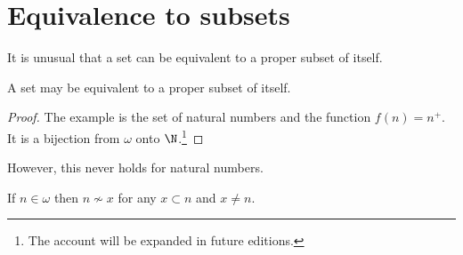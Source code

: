 \section*{Equivalence to subsets}

It is unusual that a set can be equivalent to a proper subset of itself.

\begin{proposition}
A set may be equivalent to a proper subset of itself.
\begin{proof}The example is the set of natural numbers and the function $f(n) = n^+$.
It is a bijection from $\omega $ onto $\N  $.\footnote{The account will be expanded in future editions.}\end{proof}
\end{proposition}

However, this never holds for natural numbers.
\begin{proposition}
If $n \in \omega $ then $n \not\sim x$ for any $x \subset n$ and $x \neq n$.
\end{proposition}
